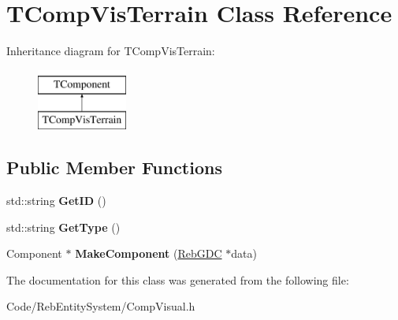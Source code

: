 \hypertarget{class_t_comp_vis_terrain}{}\section{T\+Comp\+Vis\+Terrain Class Reference}
\label{class_t_comp_vis_terrain}
Inheritance diagram for T\+Comp\+Vis\+Terrain\+:\begin{figure}[H]
\begin{center}
\leavevmode
\includegraphics[height=2.000000cm]{class_t_comp_vis_terrain}
\end{center}
\end{figure}
\subsection*{Public Member Functions}
\begin{DoxyCompactItemize}
\item 
std\+::string {\bfseries Get\+ID} ()\hypertarget{class_t_comp_vis_terrain_a909f450d9e539d026cbb2665ed20ef41}{}\label{class_t_comp_vis_terrain_a909f450d9e539d026cbb2665ed20ef41}

\item 
std\+::string {\bfseries Get\+Type} ()\hypertarget{class_t_comp_vis_terrain_a4099f7527470090787b77fa41ea517e7}{}\label{class_t_comp_vis_terrain_a4099f7527470090787b77fa41ea517e7}

\item 
Component $\ast$ {\bfseries Make\+Component} (\hyperlink{class_reb_g_d_c}{Reb\+G\+DC} $\ast$data)\hypertarget{class_t_comp_vis_terrain_aad15f5f70bb4a79a6968c6c2f8ec6421}{}\label{class_t_comp_vis_terrain_aad15f5f70bb4a79a6968c6c2f8ec6421}

\end{DoxyCompactItemize}


The documentation for this class was generated from the following file\+:\begin{DoxyCompactItemize}
\item 
Code/\+Reb\+Entity\+System/Comp\+Visual.\+h\end{DoxyCompactItemize}
